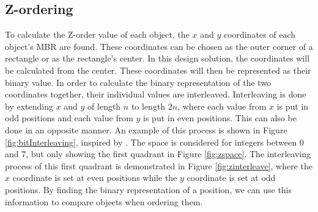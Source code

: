 \subsection{Z-ordering}
\label{sect:zordering}
To calculate the Z-order value of each object, the $x$ and $y$ coordinates of each object's MBR are found. These coordinates can be chosen as the outer corner of a rectangle or as the rectangle's center. In this design solution, the coordinates will be calculated from the center. These coordinates will then be represented as their binary value. In order to calculate the binary representation of the two coordinates together, their individual values are interleaved. Interleaving is done by extending $x$ and $y$ of length $n$ to length $2n$, where each value from $x$ is put in odd positions and each value from $y$ is put in even positions\cite{interleave}. This can also be done in an opposite manner. An example of this process is shown in Figure \ref{fig:bitInterleaving}, inspired by \cite{zorder_figure}. The space is considered for integers between 0 and 7, but only showing the first quadrant in Figure \ref{fig:zspace}. The interleaving process of this first quadrant is demonstrated in Figure \ref{fig:zinterleave}, where the $x$ coordinate is set at even positions while the $y$ coordinate is set at odd positions. By finding the binary representation of a position, we can use this information to compare objects when ordering them. 

